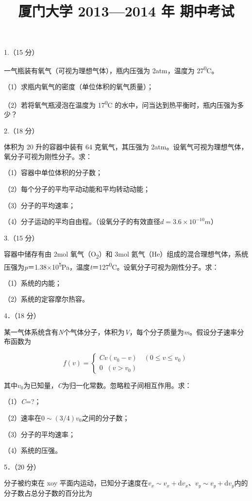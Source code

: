 \documentclass[fontset=exam]{exam-zh}
\title{厦门大学 2013—2014 年 期中考试}
\begin{document}
\maketitle
{}
1.（15 分）

一气瓶装有氧气（可视为理想气体），瓶内压强为 2atm，温度为 27\textsuperscript{0}C。

（1）求瓶内氧气的密度（单位体积的氧气质量）；

（2）若将氧气瓶浸泡在温度为 17\textsuperscript{0}C 的水中，问当达到热平衡时，瓶内压强为多少？

2.（18 分）

体积为 20 升的容器中装有 64 克氧气，其压强为 2atm。设氧气可视为理想气体，氧分子可视为刚性分子。求：

（1）容器中单位体积的分子数；

（2）每个分子的平均平动动能和平均转动动能；

（3）分子的平均速率；

（4）分子运动的平均自由程。（设氧分子的有效直径\(d = 3.6 \times 10^{- 10}m\)）

3.（15 分）

容器中储存有由 2mol 氧气（O\textsubscript{2}）和 3mol 氦气（He）组成的混合理想气体，系统压强为\emph{p}＝1.38×10\textsuperscript{5}Pa，温度\emph{t}＝127\textsuperscript{0}C。设氧分子可视为刚性分子。求：

（1）系统的内能；

（2）系统的定容摩尔热容。

4．（18 分）

某一气体系统含有\emph{N}个气体分子，体积为\emph{V}，每个分子质量为\emph{m}。假设分子速率分布函数为

\[f(v) = \left\{ \begin{matrix}
{Cv(v_{0} - v)\quad(0 \leq v \leq v_{0})} \\
{0\;\;(v > v_{0})}
\end{matrix} \right.\]

其中\(v_{0}\)为已知量，\emph{C}为归一化常数。忽略粒子间相互作用。求：

（1）\emph{C}=?；

（2）速率在\(\left. 0 \right.\sim(3/4)v_{0}\)之间的分子数；

（3）分子的平均速率；

（4）系统的压强。

5．（20 分）

分子被约束在 xoy 平面内运动，已知分子速度在\(\left. v_{x} \right.\sim v_{x} + \text{d}v_{x}\)、\(\left. v_{y} \right.\sim v_{y} + \text{d}v_{y}\)内的分子数占总分子数的百分比为
\end{document}
